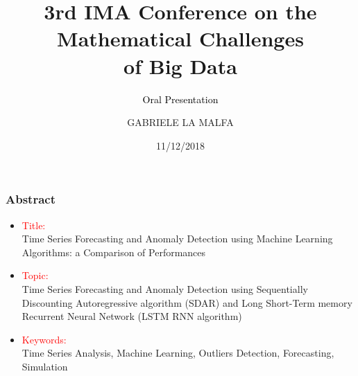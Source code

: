 \documentclass[aspectratio=1610]{beamer}
\title[3rd IMA Conference]{3rd IMA Conference on the Mathematical Challenges \\ of Big Data}
\subtitle {\textcolor{black}{Oral Presentation}}
\author{GABRIELE LA MALFA}
\institute[] %
{MSc Quantitative Finance\\
	}
\date{11/12/2018}
\begin{document}
{
\begin{frame}
\titlepage 
\end{frame}
}
{
\begin{frame}
\frametitle{Abstract}
	\begin{itemize}
		\item \textcolor{red}{Title:}\\ Time Series Forecasting and Anomaly Detection using Machine
		Learning Algorithms: a Comparison of Performances
		\item \textcolor{red}{Topic:}\\Time Series Forecasting and Anomaly Detection using Sequentially Discounting Autoregressive algorithm (SDAR) and Long Short-Term memory Recurrent Neural Network (LSTM RNN algorithm)
		\item \textcolor{red}{Keywords:}\\ Time Series Analysis, Machine Learning, Outliers Detection, Forecasting, Simulation
	\end{itemize}
\end{frame}
}
\end{document}
